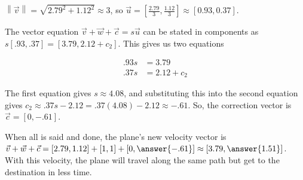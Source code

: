 \documentclass{ximera}
\begin{document}
\begin{example}
\begin{enumerate}
\end{enumerate}

  \begin{solution}

  $\left\|\vec{v}\right\|=\sqrt{2.79^2+1.12^2}\approx 3$, so $\vec{u}=\left[\frac{2.79}{3},\frac{1.12}{3}\right]\approx [0.93,0.37]$. 

  The vector equation $\vec{v}+\vec{w}+\vec{c}=s\vec{u}$ can be stated in components as $s[.93,.37]=[3.79,2.12+c_2]$. This gives us two equations

  \begin{align*}
    .93s&=3.79\\
    .37s&=2.12+c_2
  \end{align*}

  The first equation gives $s\approx 4.08$, and substituting this into the second equation gives $c_2\approx .37s-2.12=.37(4.08)-2.12\approx -.61$. So, the correction vector is $\vec{c}=[0,-.61]$.

  \end{solution}

  When all is said and done, the plane's new velocity vector is $\vec{v}+\vec{w}+\vec{c}=[2.79, 1.12]+[1,1]+[0,\answer{-.61}]\approx [3.79,\answer{1.51}]$. With this velocity, the plane will travel along the same path but get to the destination in less time.
  
\end{example}
\end{document}
